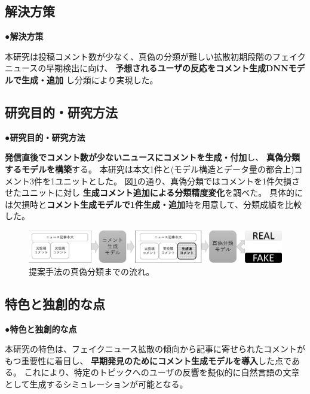 {	\subsection{解決方策}
	\noindent
	●\textbf{解決方策}

	本研究は投稿コメント数が少なく、真偽の分類が難しい拡散初期段階のフェイクニュースの早期検出に向け、
	\textbf{予想されるユーザの反応をコメント生成DNNモデルで生成・追加}
	し分類により実現した。

	\subsection{研究目的・研究方法}
	\noindent
	●\textbf{研究目的・研究方法}

	\textbf{発信直後でコメント数が少ないニュースにコメントを⽣成・付加}し、
	\textbf{真偽分類するモデルを構築}する。
	本研究は本文1件と(モデル構造とデータ量の都合上)コメント3件を1ユニットとした。
	図\ref{fig:model}の通り、真偽分類ではコメントを1件欠損させたユニットに対し
	\textbf{⽣成コメント追加による分類精度変化}を調べた。
	具体的には欠損時と\textbf{コメント生成モデルで1件生成・追加}時を用意して、分類成績を比較した。
	
	\begin{figure}[ht]
		\centering
		\includegraphics[width=0.95\linewidth]{figs/model.pdf}
		\vspace*{-3mm}
		\caption{提案手法の真偽分類までの流れ。}
		\label{fig:model}
	\end{figure}
	\vspace*{-4mm}
	\subsection{特色と独創的な点}
	\noindent
	●\textbf{特色と独創的な点}

	本研究の特⾊は、フェイクニュース拡散の傾向から記事に寄せられたコメントがもつ重要性に着目し、
	\textbf{早期発⾒のためにコメント⽣成モデルを導⼊}した点である。
	これにより、特定のトピックへのユーザの反響を擬似的に自然言語の文章として生成するシミュレーションが可能となる。

}
